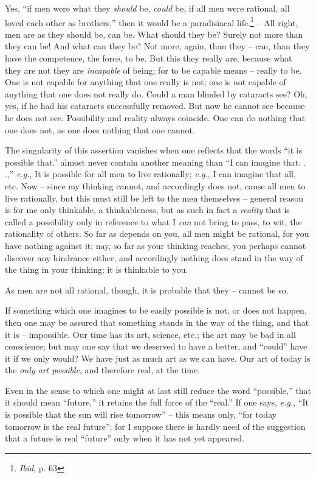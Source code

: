 \documentclass[12pt,a4paper]{book}
\begin{document}
Yes, ``if men were what they \textit{should} be, \textit{could} be, if all 
men were rational, all loved each other as brothers,'' then it would be a 
paradisiacal life.\footnote{\textit{Ibid}, p. 63} -- All right, men are as 
they should be, can be. What should they be? Surely not more than they can be! 
And what can they be? Not more, again, than they -- can, than they have the 
competence, the force, to be. But this they really are, because what they are 
not they are \textit{incapable} of being; for to be capable means -- really to 
be. One is not capable for anything that one really is not; one is not capable 
of anything that one does not really do. Could a man blinded by cataracts see? 
Oh, yes, if he had his cataracts successfully removed. But now he cannot see 
because he does not see. Possibility and reality always coincide. One can do 
nothing that one does not, as one does nothing that one cannot.

The singularity of this assertion vanishes when one reflects that the words 
``it is possible that.'' almost never contain another meaning than ``I can 
imagine that. . .,'' \textit{e.g.}, It is possible for all men to live 
rationally; \textit{e.g.}, I can imagine that all, etc. Now -- since my 
thinking cannot, and accordingly does not, cause all men to live rationally, 
but this must still be left to the men themselves -- general reason is for me 
only thinkable, a thinkableness, but as such in fact a \textit{reality} that 
is called a possibility only in reference to what I \textit{can} not bring to 
pass, to wit, the rationality of others. So far as depends on you, all men 
might be rational, for you have nothing against it; nay, so far as your 
thinking reaches, you perhaps cannot discover any hindrance either, and 
accordingly nothing does stand in the way of the thing in your thinking; it is 
thinkable to you.

As men are not all rational, though, it is probable that they -- cannot be so.

If something which one imagines to be easily possible is not, or does not 
happen, then one may be assured that something stands in the way of the thing, 
and that it is -- impossible. Our time has its art, science, etc.; the art may 
be bad in all conscience; but may one say that we deserved to have a better, 
and ``could'' have it if we only would? We have just as much art as we can 
have. Our art of today is the \textit{only art possible}, and therefore real, 
at the time.

Even in the sense to which one might at last still reduce the word 
``possible,'' that it should mean ``future,'' it retains the full force of 
the ``real.'' If one says, \textit{e.g.}, ``It is possible that the sun 
will rise tomorrow'' -- this means only, ``for today tomorrow is the real 
future''; for I suppose there is hardly need of the suggestion that a future 
is real ``future'' only when it has not yet appeared.
\end{document}
